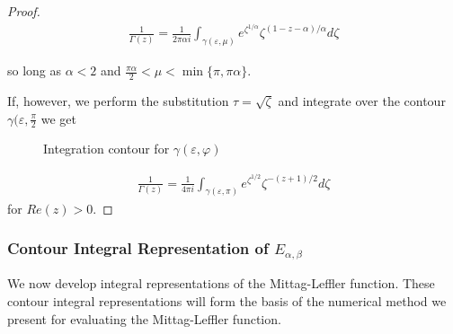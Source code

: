 \begin{proof}
\begin{align}
    \frac{1}{\Gamma(z)} = \frac{1}{2 \pi \alpha i} \int_{\gamma(\varepsilon, \mu)} 
			  e^{\zeta^{1 / \alpha}} \zeta^{(1-z-\alpha) / \alpha} d\zeta 
\end{align}

so long as $ \alpha < 2 $ and $ \frac{\pi \alpha}{2} < \mu < \min\{ \pi, \pi \alpha \} $.

If, however, we perform the substitution $ \tau = \sqrt{\zeta} $ and integrate over the contour $ \gamma(\varepsilon, \frac{\pi}{2} $ we get

\begin{wrapfigure}{l}{10pt}
    
    \caption{ Integration contour for $ \gamma(\varepsilon, \varphi) $}
    \label{fig:hankel_wedge_2}
\end{wrapfigure}

\begin{align}
    \frac{1}{\Gamma(z)} = \frac{1}{4 \pi i} \int_{\gamma(\varepsilon, \pi)} e^{\zeta^{1 / 2}} \zeta^{-(z + 1) / 2} d\zeta
\end{align}
for $ Re(z) > 0 $.

\end{proof}

\subsubsection{Contour Integral Representation of $ E_{\alpha, \beta} $ }

We now develop integral representations of the Mittag-Leffler function. These contour integral representations will form the basis of the numerical method we present for evaluating the Mittag-Leffler function.

